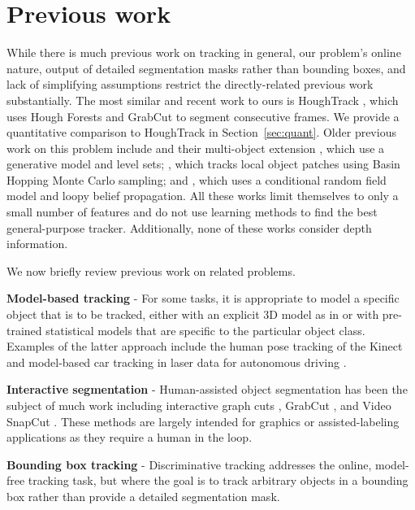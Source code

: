 \documentclass[graybox]{svmult}
\begin{document}
\section{Previous work}
\label{sec:prev_work}

While there is much previous work on tracking in general, our problem's online nature, output of detailed segmentation masks rather than bounding boxes, and lack of simplifying assumptions restrict the directly-related previous work substantially.  The most similar and recent work to ours is HoughTrack \cite{godec2011a}, which uses Hough Forests and GrabCut to segment consecutive frames.  We provide a quantitative comparison to HoughTrack in Section~\ref{sec:quant}.  Older previous work on this problem include \cite{bibby2008a} and their multi-object extension \cite{bibby2010a}, which use a generative model and level sets; \cite{kwon2009a}, which tracks local object patches using Basin Hopping Monte Carlo sampling; and \cite{ren2007a}, which uses a conditional random field model and loopy belief propagation. All these works limit themselves to only a small number of features and do not use learning methods to find the best general-purpose tracker.  Additionally, none of these works consider depth information.

We now briefly review previous work on related problems.

\textbf{Model-based tracking} - For some tasks, it is appropriate to model a specific object that is to be tracked, either with an explicit 3D model as in \cite{prisacariu2009a} or with pre-trained statistical models that are specific to the particular object class.  Examples of the latter approach include the human pose tracking of the Kinect \cite{shotton2011a} and model-based car tracking in laser data for autonomous driving \cite{petrovskaya2009a}.

\textbf{Interactive segmentation} - Human-assisted object segmentation has been the subject of much work including interactive graph cuts \cite{boykov2001a}, GrabCut \cite{rother2004a}, and Video SnapCut \cite{bai2009a}.  These methods are largely intended for graphics or assisted-labeling applications as they require a human in the loop.

\textbf{Bounding box tracking} - Discriminative tracking \cite{grabner2006a, stalder2009a, kalal2010a} addresses the online, model-free tracking task, but where the goal is to track arbitrary objects in a bounding box rather than provide a detailed segmentation mask.
\end{document}
